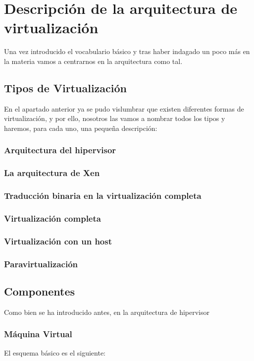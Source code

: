 \chapter{Descripción de la arquitectura de virtualización}

\lettrine[lines=1,slope=4pt,findent=0pt]{U}{}na vez introducido el vocabulario básico y tras haber indagado un poco más en la materia vamos a centrarnos en la arquitectura como tal.\\

\section{Tipos de Virtualización}
En el apartado anterior ya se pudo vislumbrar que existen diferentes formas de virtualización, y por ello, nosotros las vamos a nombrar todos los tipos y haremos, para cada uno, una pequeña descripción:

\subsection{Arquitectura del hipervisor}

\subsection{La arquitectura de Xen}
\subsection{Traducción binaria en la virtualización completa}
\subsection{Virtualización completa}
\subsection{Virtualización con un host}
\subsection{Paravirtualización}

\section{Componentes}

Como bien se ha introducido antes, en la arquitectura de hipervisor

\subsection{Máquina Virtual}
El esquema básico es el siguiente:

\begin{center}
\end{center}